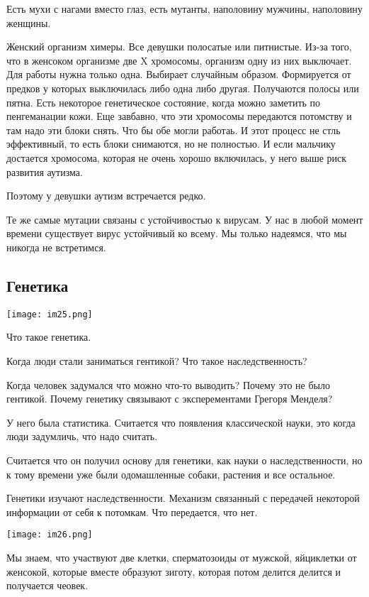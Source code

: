 Есть мухи с нагами вместо глаз, 
есть мутанты, наполовину мужчины, наполовину женщины. 

Женский организм химеры. Все девушки полосатые или питнистые. Из-за того, 
что в женсоком организме две X хромосомы, организм одну из них выключает. Для 
работы нужна только одна. Выбирает случайным образом. Формируется от предков у которых 
выключилась либо одна либо другая. Получаются полосы или пятна. 
Есть некоторое генетическое состояние, когда можно заметить по пенгеманации кожи. 
Еще завбавно, что эти хромосомы передаются потомству и там 
надо эти блоки снять. Что бы обе могли работаь. И этот 
процесс не стль эффективный, то есть блоки снимаются, но не полностью. 
И если мальчику достается хромосома, которая не очень хорошо включилась, 
у него выше риск развития аутизма. 

Поэтому у девушки аутизм встречается редко. 

Те же самые мутации связаны с устойчивостью к вирусам. У нас в любой момент 
времени существует вирус устойчивый ко всему. Мы только надеямся, что мы никогда не встретимся. 

\subsection{Генетика}
\texttt{[image: im25.png]}

Что такое генетика. 

Когда люди стали заниматься гентикой? 
Что такое наследственность?

Когда человек задумался что можно что-то выводить? Почему 
это не было гентикой. Почему генетику связывают с эксперементами Грегоря Менделя? 

У него была статистика. Считается что появления классической науки, это
когда люди задумличь, что надо считать. 

Считается что он получил основу для генетики, как науки о наследственности, 
но к тому времени уже были одомашленные собаки, растения и все остальное. 

Генетики изучают наследственности. Механизм связанный с передачей некоторой информации
от себя к потомкам. Что передается, что нет.
 
\texttt{[image: im26.png]}

Мы знаем, что участвуют две клетки, сперматозоиды от мужской, 
яйциклетки от женсокой, которые вместе образуют зиготу, которая потом 
делится делится и получается чеовек. 


